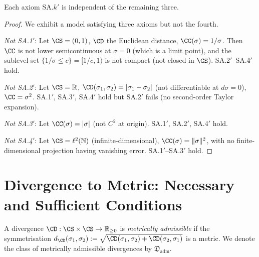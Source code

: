 \begin{lemma}\label{lem:15.2}
Each axiom SA.$k'$ is independent of the remaining three.
\end{lemma}

\begin{proof}
We exhibit a model satisfying three axioms but not the fourth.

\emph{Not SA.1$'$}: Let $\CS = (0, 1)$, $\CD$ the Euclidean distance,
$\CC(\sigma) = 1/\sigma$.  Then $\CC$ is not lower semicontinuous at
$\sigma = 0$ (which is a limit point), and the sublevel set
$\{1/\sigma \leq c\} = [1/c, 1)$ is not compact (not closed in
$\CS$).  SA.2$'$--SA.4$'$ hold.

\emph{Not SA.2$'$}: Let $\CS = \mathbb{R}$,
$\CD(\sigma_1, \sigma_2) = |\sigma_1 - \sigma_2|$
(not differentiable at $d\sigma = 0$), $\CC = \sigma^2$.
SA.1$'$, SA.3$'$, SA.4$'$ hold but SA.2$'$ fails (no second-order
Taylor expansion).

\emph{Not SA.3$'$}: Let $\CC(\sigma) = |\sigma|$ (not $C^2$ at origin).
SA.1$'$, SA.2$'$, SA.4$'$ hold.

\emph{Not SA.4$'$}: Let $\CS = \ell^2(\mathbb{N})$ (infinite-dimensional),
$\CC(\sigma) = \|\sigma\|^2$, with no finite-dimensional projection having
vanishing error.  SA.1$'$--SA.3$'$ hold.
\end{proof}

\section{Divergence to Metric: Necessary and Sufficient Conditions}
\label{sec:ch15:div-metric}

\begin{definition}\label{def:15.2}
A divergence $\CD : \CS \times \CS \to \mathbb{R}_{\geq 0}$ is
\emph{metrically admissible} if the symmetrisation
$d_{\CD}(\sigma_1, \sigma_2) :=
\sqrt{\CD(\sigma_1, \sigma_2) + \CD(\sigma_2, \sigma_1)}$
is a metric.  We denote the class of metrically admissible divergences
by $\mathfrak{D}_{\mathrm{adm}}$.
\end{definition}

